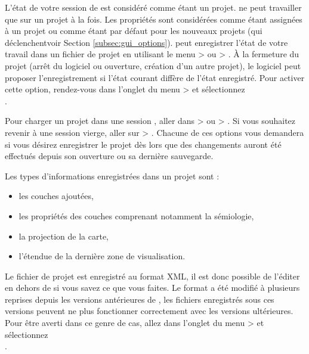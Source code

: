 L'état de votre session de \qg est considéré comme étant un projet. \qg ne peut travailler que sur un projet à la fois. Les propriétés sont considérées comme étant assignées à un projet ou comme étant par défaut pour les nouveaux projets (qui déclenchentvoir Section \ref{subsec:gui_options}). \qg peut enregistrer l'état de votre travail dans un fichier de projet en utilisant le menu  >  ou  > . À la fermeture du projet (arrêt du logiciel ou ouverture, création d'un autre projet), le logiciel peut proposer l'enregistrement si l'état courant diffère de l'état enregistré. Pour activer cette option, rendez-vous dans l'onglet  du menu  >  et sélectionnez\\
.

Pour charger un projet dans une session \qg, aller dans  >  ou  > . Si vous souhaitez revenir à une session vierge, aller sur  > .
Chacune de ces options vous demandera si vous désirez enregistrer le projet dès lors que des changements auront été effectués depuis son ouverture ou sa dernière sauvegarde.

Les types d'informations enregistrées dans un projet sont :

\begin{itemize}[label=--]
\item les couches ajoutées,
\item les propriétés des couches comprenant notamment la sémiologie,
\item la projection de la carte,
\item l'étendue de la dernière zone de visualisation.
\end{itemize}

Le fichier de projet est enregistré au format XML, il est donc possible de l'éditer en dehors de \qg si vous savez ce que vous faites. Le format a été modifié à plusieurs reprises depuis les versions antérieures de \qg, les fichiers enregistrés sous ces versions peuvent ne plus fonctionner correctement avec les versions ultérieures. Pour être averti dans ce genre de cas, allez dans l'onglet  du menu  >  et sélectionnez\\
.

